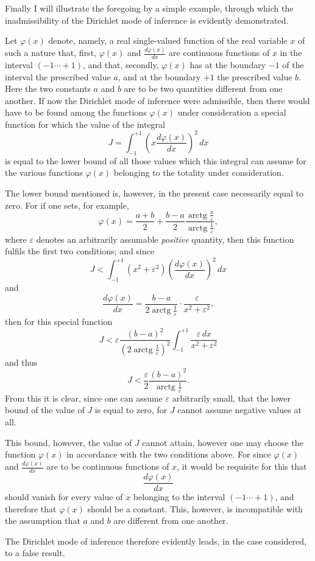 \documentclass{article}
\begin{document}
Finally I will illustrate the foregoing by a simple example, through which the inadmissibility of the Dirichlet mode of inference is evidently demonstrated.

Let $\varphi(x)$ denote, namely, a real single-valued function of the real variable $x$ of such a nature that, first, $\varphi(x)$ and $\frac{d\varphi(x)}{dx}$ are continuous functions of $x$ in the interval $(-1 \cdots +1)$, and that, secondly, $\varphi(x)$ has at the boundary $-1$ of the interval the prescribed value $a$, and at the
boundary $+1$ the prescribed value $b$. Here the two constants $a$ and $b$ are to be two quantities different from one another. If now the Dirichlet mode of inference were admissible, then there would have to be found among the functions $\varphi(x)$ under consideration a special function for which the value of the integral
\[
J = \int_{-1}^{+1} \left( x \frac{d\varphi(x)}{dx} \right)^{2} \,dx
\]
is equal to the lower bound of all those values which this integral can assume for the various functions $\varphi(x)$ belonging to the totality under consideration.

The lower bound mentioned is, however, in the present case necessarily equal to zero. For if one sets, for example,
\[
\varphi(x) = \frac{a+b}{2} + \frac{b-a}{2} \frac{\operatorname{arctg} \frac{x}{\varepsilon}}{\operatorname{arctg} \frac{1}{\varepsilon}},
\]
where $\varepsilon$ denotes an arbitrarily assumable \emph{positive} quantity, then this function fulfils the first two conditions; and since
\[
J < \int_{-1}^{+1} (x^{2} + \varepsilon^{2}) \left( \frac{d\varphi(x)}{dx} \right)^{2} \,dx
\]
and
\[
\frac{d\varphi(x)}{dx} = \frac{b-a}{2 \operatorname{arctg} \frac{1}{\varepsilon}} \cdot \frac{\varepsilon}{x^{2} + \varepsilon^{2}},
\]
then for this special function
\[
J < \varepsilon \frac{(b-a)^{2}}{\left( 2 \operatorname{arctg} \frac{1}{\varepsilon} \right)^{2}} \int_{-1}^{+1} \frac{\varepsilon \,dx}{x^{2} + \varepsilon^{2}}
\]
and thus
\[
J < \frac{\varepsilon}{2} \frac{(b-a)^{2}}{\operatorname{arctg} \frac{1}{\varepsilon}}.
\]
From this it is clear, since one can assume $\varepsilon$ arbitrarily small, that the lower bound of the value of $J$ is equal to zero, for $J$ cannot assume negative values at all.

This bound, however, the value of $J$ cannot attain, however one may choose the function $\varphi(x)$ in accordance with the two conditions above. For since $\varphi(x)$ and $\frac{d\varphi(x)}{dx}$ are to be continuous functions of $x$, it would be requisite for this that
\[
\frac{d\varphi(x)}{dx}
\]
should vanish for every value of $x$ belonging to the interval $(-1 \cdots +1)$, and therefore that $\varphi(x)$ should be a constant. This, however, is incompatible with the assumption that $a$ and $b$ are different from one another.

The Dirichlet mode of inference therefore evidently leads, in the case considered, to a false result.
\end{document}
